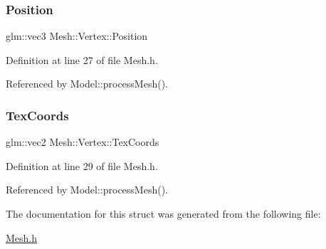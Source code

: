 \mbox{\label{structMesh_1_1Vertex_a6c5e0102d84ee335346ef8fadf43ecd0}} 
\subsubsection{\texorpdfstring{Position}{Position}}
{\footnotesize\ttfamily glm\+::vec3 Mesh\+::\+Vertex\+::\+Position}



Definition at line 27 of file Mesh.\+h.



Referenced by Model\+::process\+Mesh().

\mbox{\label{structMesh_1_1Vertex_a7f4c7ecd20476006a2869452cb2e022b}} 
\subsubsection{\texorpdfstring{Tex\+Coords}{TexCoords}}
{\footnotesize\ttfamily glm\+::vec2 Mesh\+::\+Vertex\+::\+Tex\+Coords}



Definition at line 29 of file Mesh.\+h.



Referenced by Model\+::process\+Mesh().



The documentation for this struct was generated from the following file\+:\begin{DoxyCompactItemize}
\item 
\mbox{\hyperlink{Mesh_8h}{Mesh.\+h}}\end{DoxyCompactItemize}
